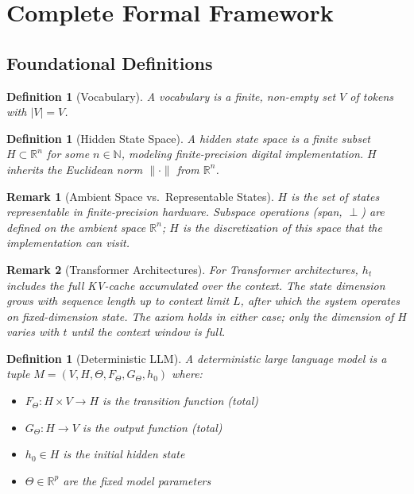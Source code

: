 \documentclass[11pt,a4paper]{article}
\newtheorem{definition}[theorem]{Definition}
\newtheorem*{remark}{Remark}
\begin{document}
\appendix

\section{Complete Formal Framework}

\subsection{Foundational Definitions}

\begin{definition}[Vocabulary]
A vocabulary is a finite, non-empty set $V$ of tokens with $|V| = V$.
\end{definition}

\begin{definition}[Hidden State Space]
A hidden state space is a finite subset $H \subset \mathbb{R}^n$ for some $n \in \mathbb{N}$, modeling finite-precision digital implementation. $H$ inherits the Euclidean norm $\|\cdot\|$ from $\mathbb{R}^n$.
\end{definition}

\begin{remark}[Ambient Space vs.\ Representable States]
$H$ is the set of states representable in finite-precision hardware. Subspace operations (span, $\perp$) are defined on the ambient space $\mathbb{R}^n$; $H$ is the discretization of this space that the implementation can visit.
\end{remark}

\begin{remark}[Transformer Architectures]
For Transformer architectures, $h_t$ includes the full KV-cache accumulated over the context. The state dimension grows with sequence length up to context limit $L$, after which the system operates on fixed-dimension state. The axiom holds in either case; only the dimension of $H$ varies with $t$ until the context window is full.
\end{remark}

\begin{definition}[Deterministic LLM]
A deterministic large language model is a tuple $M = (V, H, \Theta, F_\Theta, G_\Theta, h_0)$ where:
\begin{itemize}
    \item $F_\Theta: H \times V \to H$ is the transition function (total)
    \item $G_\Theta: H \to V$ is the output function (total)
    \item $h_0 \in H$ is the initial hidden state
    \item $\Theta \in \mathbb{R}^p$ are the fixed model parameters
\end{itemize}
\end{definition}
\end{document}
